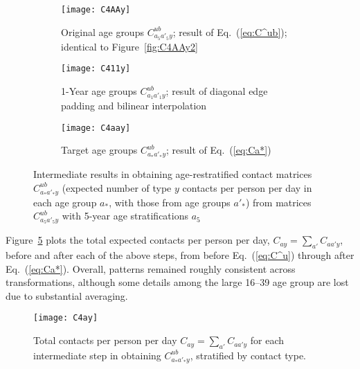 \begin{figure}
  \begin{subfigure}{\linewidth}
    \texttt{[image: C4AAy]}
    \caption{Original age groups $C^{ub}_{a_5a'_5y}$; result of Eq.~(\ref{eq:C^ub}); identical to Figure~\ref{fig:C4AAy2}}
    \label{fig:C4AAy}
  \end{subfigure}
  \begin{subfigure}{\linewidth}
    \texttt{[image: C411y]}
    \caption{1-Year age groups $C^{ub}_{a_1a'_1y}$; result of diagonal edge padding and bilinear interpolation}
    \label{fig:C411y}
  \end{subfigure}
  \begin{subfigure}{\linewidth}
    \texttt{[image: C4aay]}
    \caption{Target age groups $C^{ub}_{a_*a'_*y}$; result of Eq.~(\ref{eq:Ca*})}
    \label{fig:C4aay}
  \end{subfigure}
  \caption{Intermediate results in obtaining age-restratified contact matrices $C^{ub}_{a_*a'_*y}$
    (expected number of type $y$ contacts per person per day in each age group $a_*$, with those from age groups $a'_*$)
    from matrices $C^{ub}_{a_5a'_5y}$ with 5-year age stratifications $a_5$}
  \label{fig:C4**y}
\end{figure}
\par
Figure~\ref{fig:C4Ay} plots the total expected contacts per person per day,
$C_{ay} = \sum_{a'} C_{aa'y}$, before and after each of the above steps,
from before Eq.~(\ref{eq:C^u}) through after Eq.~(\ref{eq:Ca*}).
Overall, patterns remained roughly consistent across transformations,
although some details among the large 16--39 age group are lost due to substantial averaging.%
\begin{figure}
  \centering
  \texttt{[image: C4ay]}
  \caption{Total contacts per person per day $C_{ay} = \sum_{a'} C_{aa'y}$
    for each intermediate step in obtaining $C^{ub}_{a_*a'_*y}$,
    stratified by contact type.}
  \label{fig:C4Ay}
\end{figure}
